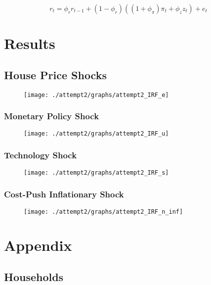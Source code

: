 \documentclass[11pt, a4paper]{article}
\begin{document}
\begin{equation}
	r_{t}=\phi_{r} r_{t-1}+\left(1-\phi_{r}\right)\left(\left(1+\phi_{\pi}\right) \pi_{t}+\phi_{z} z_{t}\right)+e_{t}
\end{equation}

\section{Results}

\subsection{House Price Shocks}
\begin{figure}[H]\centering
  \texttt{[image: ./attempt2/graphs/attempt2\_IRF\_e]}
  \caption{}
\end{figure}

\subsubsection{Monetary Policy Shock}
\begin{figure}[H]\centering
  \texttt{[image: ./attempt2/graphs/attempt2\_IRF\_u]}
  \caption{}
\end{figure}

\subsubsection{Technology Shock}
\begin{figure}[H]\centering
  \texttt{[image: ./attempt2/graphs/attempt2\_IRF\_s]}
  \caption{}
\end{figure}

\subsubsection{Cost-Push Inflationary Shock}
\begin{figure}[H]\centering
  \texttt{[image: ./attempt2/graphs/attempt2\_IRF\_n\_inf]}
  \caption{}
\end{figure}


\section{Appendix}
\subsection{Households}
\end{document}

